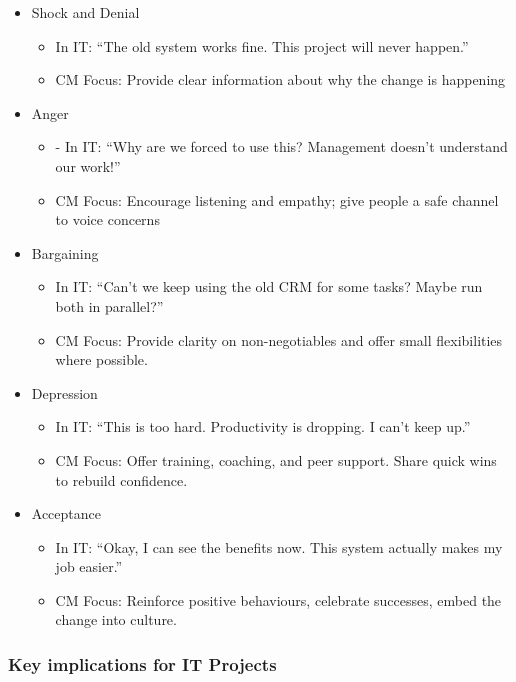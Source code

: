 \begin{itemize}
    \item Shock and Denial
    \begin{itemize}
        \item In IT: “The old system works fine. This project will never happen.”
        \item CM Focus: Provide clear information about why the change is happening
    \end{itemize}
    \item Anger
    \begin{itemize}
        \item - In IT: “Why are we forced to use this? Management doesn’t understand our work!”
        \item CM Focus: Encourage listening and empathy; give people a safe channel to voice concerns
    \end{itemize}
    \item Bargaining
    \begin{itemize}
        \item In IT: “Can’t we keep using the old CRM for some tasks? Maybe run both in parallel?”
        \item CM Focus: Provide clarity on non-negotiables and offer small flexibilities where possible.
    \end{itemize}
    \item Depression
    \begin{itemize}
        \item In IT: “This is too hard. Productivity is dropping. I can’t keep up.”
        \item CM Focus: Offer training, coaching, and peer support. Share quick wins to rebuild confidence.
    \end{itemize}
    \item Acceptance
    \begin{itemize}
        \item In IT: “Okay, I can see the benefits now. This system actually makes my job easier.”
        \item CM Focus: Reinforce positive behaviours, celebrate successes, embed the change into culture.
    \end{itemize}
\end{itemize}

\subsubsection{Key implications for IT Projects}

